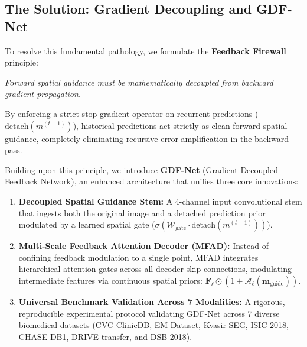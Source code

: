 \subsection{The Solution: Gradient Decoupling and GDF-Net}
To resolve this fundamental pathology, we formulate the \textbf{Feedback Firewall} principle:
\begin{center}
  \textit{Forward spatial guidance must be mathematically decoupled from backward gradient propagation.}
\end{center}
By enforcing a strict stop-gradient operator on recurrent predictions ($\text{detach}(m^{(t-1)})$), historical predictions act strictly as clean forward spatial guidance, completely eliminating recursive error amplification in the backward pass.

Building upon this principle, we introduce \textbf{GDF-Net} (Gradient-Decoupled Feedback Network), an enhanced architecture that unifies three core innovations:
\begin{enumerate}
  \item \textbf{Decoupled Spatial Guidance Stem:} A 4-channel input convolutional stem that ingests both the original image and a detached prediction prior modulated by a learned spatial gate ($\sigma(\mathcal{W}_{\text{gate}} \cdot \text{detach}(m^{(t-1)}))$).
  \item \textbf{Multi-Scale Feedback Attention Decoder (MFAD):} Instead of confining feedback modulation to a single point, MFAD integrates hierarchical attention gates across all decoder skip connections, modulating intermediate features via continuous spatial priors: $\mathbf{F}_\ell \odot (1 + \mathcal{A}_\ell(\mathbf{m}_{\text{guide}}))$.
  \item \textbf{Universal Benchmark Validation Across 7 Modalities:} A rigorous, reproducible experimental protocol validating GDF-Net across 7 diverse biomedical datasets (CVC-ClinicDB, EM-Dataset, Kvasir-SEG, ISIC-2018, CHASE-DB1, DRIVE transfer, and DSB-2018).
\end{enumerate}

